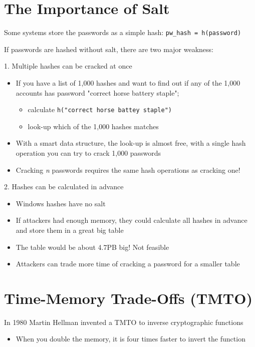 \documentclass[11pt]{article}
\begin{document}
\section*{The Importance of Salt}

Some systems store the passwords as a simple hash: \verb|pw_hash = h(password)|

If passwords are hashed without salt, there are two major weakness:

1. Multiple hashes can be cracked at once
\begin{itemize}
	\item If you have a list of 1,000 hashes and want to find out if any of the 1,000 accounts has password "correct horse battery staple";
		\begin{itemize}
			\item calculate \verb|h("correct horse battey staple")|
			\item look-up which of the 1,000 hashes matches
		\end{itemize}
	\item With a smart data structure, the look-up is almost free, with a single hash operation you can try to crack 1,000 passwords
	\item Cracking \textit{n} passwords requires the same hash operations as cracking one!

\end{itemize}


2. Hashes can be calculated in advance
\begin{itemize}
	\item Windows hashes have no salt
	\item If attackers had enough memory, they could calculate all hashes in advance and store them in a great big table
	\item The table would be about 4.7PB big! Not feasible
	\item Attackers can trade more time of cracking a password for a smaller table
\end{itemize}


\section*{Time-Memory Trade-Offs (TMTO)}

In 1980 Martin Hellman invented a TMTO to inverse cryptographic functions

\begin{itemize}
	\item When you double the memory, it is four times faster to invert the function
\end{itemize}
\end{document}
